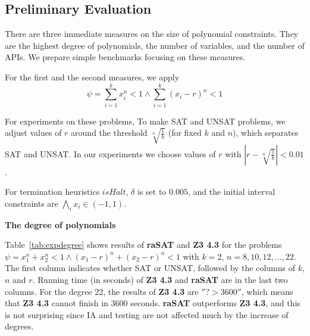 \documentclass[runningheads,a4paper,oribibl]{llncs}
\newcommand{\smallHead}[1]{%
    \par\vspace{.35cm}\noindent\textbf{#1}%
    \par\noindent\ignorespaces%
}
\begin{document}
\subsection {Preliminary Evaluation} \label{sec:experiments}
There are three immediate measures on the size of polynomial constraints. They are the highest degree of polynomials, the number of variables, and the number of APIs. We prepare simple benchmarks focusing on these measures. 

For the first and the second measures, we apply 
\begin{equation}\label{eq:circle}
\psi = \displaystyle \sum\limits_{i=1}^{k} x_i^n < 1 \wedge 
\displaystyle \sum\limits_{i=1}^{k} (x_i-r)^n < 1
\end{equation} 

For experiments on these problems, 
To make SAT and UNSAT problems, we adjust values of $r$ around the threshold 
$\sqrt[n]{\frac{1}{k}}$ (for fixed $k$ and $n$), which separates SAT and UNSAT. 
In our experiments we choose values of $r$ with $|r - \sqrt[n]{\frac{1}{k}}| < 0.01$.

For termination heuristics $isHalt$, $\delta$ is set to $0.005$, and 
the initial interval constraints are $\bigwedge \limits_{i} x_i \in (-1,1)$.





\smallHead{The degree of polynomials}

Table~\ref{tab:expdegree} shows results of \textbf{raSAT} and \textbf{Z3 4.3} 
for the problems $\psi = x_1^n + x_2^n < 1 \wedge (x_1-r)^n + (x_2-r)^n <1$
with $k=2$, $n = 8, 10, 12,..., 22$. 
The first column indicates whether SAT or UNSAT, followed by the columns of $k$, $n$ and $r$. 
Running time (in seconds) of \textbf{Z3 4.3} and \textbf{raSAT} are in the last two columns. 
For the degree 22, the results of \textbf{Z3 4.3} are $''? >3600''$, which means 
that \textbf{Z3 4.3} cannot finish in 3600 seconds. 
{\bf raSAT} outperforms \textbf{Z3 4.3}, and this is not surprising since IA and testing are 
not affected much by the increase of degrees. 
\end{document}
